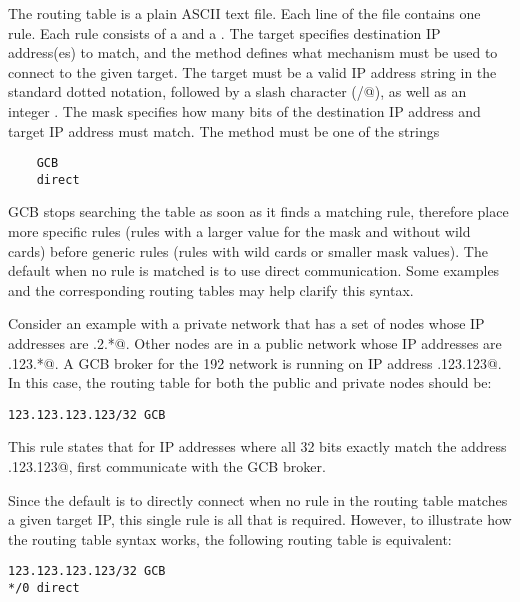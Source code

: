 The routing table is a plain ASCII text file.
Each line of the file contains one rule.
Each rule consists of a  and a .
The target specifies destination IP address(es) to match, and the method
defines what mechanism must be used to connect to the given target.
The target must be a valid IP address string in the standard
dotted notation, followed by a slash character (\verb@/@),
as well as an integer .
The mask specifies how many bits of the destination IP address
and target IP address must match.
The method must be one of the strings 
\begin{verbatim}
    GCB
    direct
\end{verbatim}
GCB stops searching the table as soon as it finds a matching rule,
therefore place more specific rules
(rules with a larger value for the mask and without wild cards)
before generic rules
(rules with wild cards or smaller mask values).
The default when no rule is matched is to use direct communication.
Some examples and the corresponding routing tables may help clarify
this syntax.



Consider an example with
a private network that has a set of nodes whose IP
addresses are .2.*@.
Other nodes are in a public network 
whose IP addresses are .123.*@.
A GCB broker for the 192
network is running on IP address .123.123@.
In this case, the routing table for both the public and private nodes
should be:

\begin{verbatim}
123.123.123.123/32 GCB
\end{verbatim}

This rule states that for IP addresses where all 32 bits exactly match
the address .123.123@, first communicate with the GCB broker.

Since the default is to directly connect when no rule in the routing
table matches a given target IP, this single rule is all that is
required.
However, to illustrate how the routing table syntax works, the
following routing table is equivalent:

\begin{verbatim}
123.123.123.123/32 GCB
*/0 direct
\end{verbatim}

